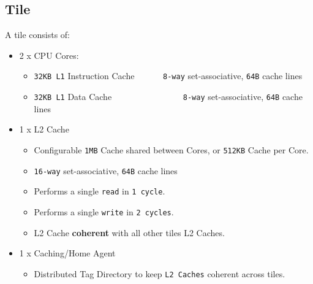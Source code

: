 \documentclass[bsc,frontabs,twoside,singlespacing,parskip,deptreport]{infthesis}     %
\begin{document}
\subsection{Tile}
A tile consists of:
\begin{itemize}
    \item 2 x CPU Cores:
    \begin{itemize}
        \item \texttt{32KB L1} Instruction Cache \ \ \ \ \ \ \texttt{8-way} set-associative, \texttt{64B} cache lines
        \item \texttt{32KB L1} Data Cache \ \ \ \ \ \ \ \ \ \ \ \ \ \ \ \ \texttt{8-way} set-associative, \texttt{64B} cache lines
    \end{itemize}
    
    \item 1 x L2 Cache
    \begin{itemize}
        \item Configurable \texttt{1MB} Cache shared between Cores, or \texttt{512KB} Cache per Core.
        \item \texttt{16-way} set-associative, \texttt{64B} cache lines
        \item Performs a single \texttt{read} in \texttt{1 cycle}.
        \item Performs a single \texttt{write} in \texttt{2 cycles}.
        \item L2 Cache \textbf{coherent} with all other tiles L2 Caches.
    \end{itemize}
    
    \item 1 x Caching/Home Agent
    \begin{itemize}
        \item Distributed Tag Directory to keep \texttt{L2 Caches} coherent across tiles.
    \end{itemize}
\end{itemize}
\end{document}
